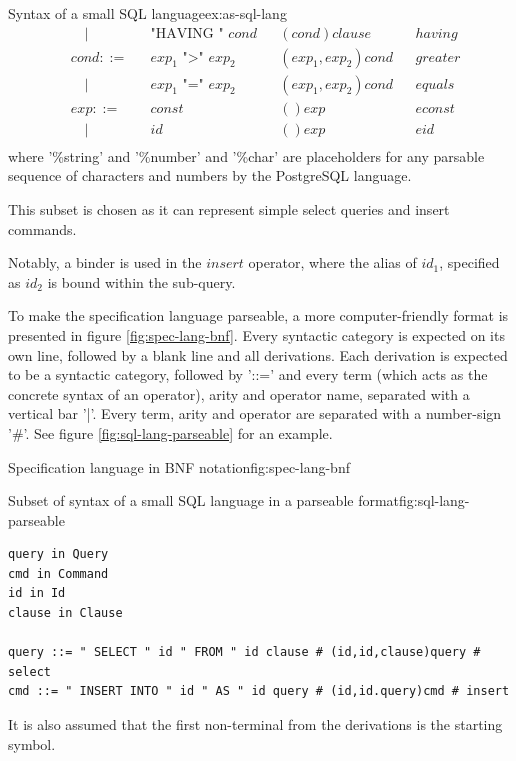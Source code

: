 \documentclass{article}
\begin{document}
\begin{example}{Syntax of a small SQL language}{ex:as-sql-lang}
\[\begin{aligned}
& \quad | &     &\text{"HAVING " $cond$}&                           &(cond)clause&              &having                \\
&cond ::=&      &\text{$exp_1$ ">" $exp_2$}&                        &(exp_1,exp_2)cond&         &greater                   \\
& \quad | &     &\text{$exp_1$ "=" $exp_2$}&                        &(exp_1,exp_2)cond&         &equals                \\
&exp ::=&       &\text{$const$}&                                    &()exp&                     &econst                   \\
& \quad | &     &\text{$id$}&                                       &()exp&                     &eid                \\
\end{aligned}
\]
where '\%string' and '\%number' and '\%char' are placeholders for any parsable sequence of characters and numbers by the PostgreSQL language.

This subset is chosen as it can represent simple select queries and insert commands.

Notably, a binder is used in the $insert$ operator, where the alias of $id_1$, specified as $id_2$ is bound within the sub-query.
\end{example}

To make the specification language parseable, a more computer-friendly format is presented in figure \ref{fig:spec-lang-bnf}. Every syntactic category is expected on its own line, followed by a blank line and all derivations. Each derivation is expected to be a syntactic category, followed by '::=' and every term (which acts as the concrete syntax of an operator), arity and operator name, separated with a vertical bar '|'. Every term, arity and operator are separated with a number-sign '\#'. See figure \ref{fig:sql-lang-parseable} for an example.

\begin{myfigure}{Specification language in BNF notation}{fig:spec-lang-bnf}

\end{myfigure}

\begin{myfigure}{Subset of syntax of a small SQL language in a parseable format}{fig:sql-lang-parseable}
\begin{lstlisting}
query in Query
cmd in Command
id in Id
clause in Clause

query ::= " SELECT " id " FROM " id clause # (id,id,clause)query # select
cmd ::= " INSERT INTO " id " AS " id query # (id,id.query)cmd # insert
\end{lstlisting}

It is also assumed that the first non-terminal from the derivations is the starting symbol.

\end{myfigure}
\end{document}
